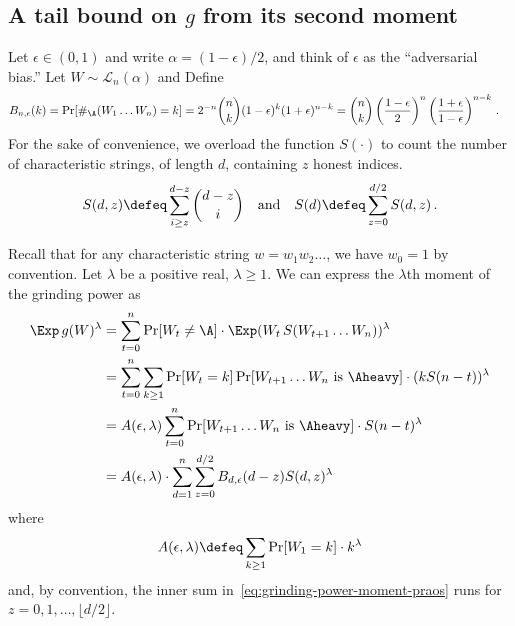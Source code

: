 \subsection{A tail bound on $g$ from its second moment}
Let $\epsilon \in (0, 1)$ and write $\alpha = (1 - \epsilon)/2$, and 
think of $\epsilon$ as the ``adversarial bias.'' 
Let $W \sim \mathcal{L}_n(\alpha)$ and 
Define 
\begin{align}\label{eq:suffix-prob-binomial}
    B_{n, \epsilon}(k) 
    &= \Pr[ \#_\A(W_1 \ldots W_n) = k ]  
    = 2^{-n}\binom{n}{k} (1-\epsilon)^k (1 + \epsilon)^{n-k} 
    =  \binom{n}{k} 
        \left(\frac{1-\epsilon}{2}\right)^n 
        \left(\frac{1 + \epsilon}{1-\epsilon} \right)^{n-k} 
        \,.
\end{align}
For the sake of convenience, 
we overload the function $S(\cdot)$ 
to count the number of characteristic strings, 
of length $d$, containing $z$ honest indices.
\begin{equation}\label{eq:S_d_z}
  S(d, z) 
    \defeq \sum_{i \geq z}^{d-z}{ \binom{d-z}{i} } 
    \quad\text{and}\quad
  S(d) \defeq \sum_{z = 0}^{d/2} S(d,z)
  \,.  
\end{equation}

Recall that for any characteristic string $w = w_1 w_2 \ldots$, 
we have $w_0 = 1$ by convention. 
Let $\lambda$ be a positive real, $\lambda \geq 1$. 
We can express the $\lambda$th moment of the grinding power as
\begin{align}\label{eq:grinding-power-moment-praos}
    \Exp\, g(W)^\lambda 
    &= \sum_{t = 0}^n \Pr[W_t \neq \A] \cdot \Exp (W_t\, S(W_{t+1}\ldots W_n))^\lambda \nonumber \\
    &= \sum_{t = 0}^n
    \sum_{k \geq 1} 
      \Pr[W_{t} = k] \Pr[\text{$W_{t+1}\ldots W_n$ is $\Aheavy$}]\cdot (k S(n - t) )^\lambda \nonumber \\
    &= A(\epsilon, \lambda) 
      \sum_{t = 0}^n 
      \Pr[\text{$W_{t+1}\ldots W_n$ is $\Aheavy$}]\cdot S(n-t)^\lambda \nonumber \\
    &=  %
        A(\epsilon, \lambda)
        \cdot 
        \sum_{d=1}^n \sum_{z = 0}^{ d/2 } B_{d, \epsilon}(d - z) S(d,z)^\lambda
\end{align}
where 
\begin{equation}
  A(\epsilon, \lambda) \defeq \sum_{k\geq 1} \Pr[W_1 = k] \cdot k^\lambda
  \label{eq:A}
\end{equation}
and, by convention, 
the inner sum in~\eqref{eq:grinding-power-moment-praos} 
runs for $z = 0, 1, \ldots, \lfloor d/2 \rfloor$.

